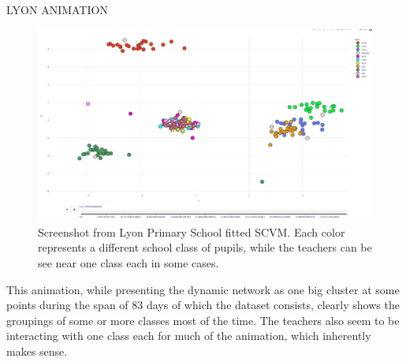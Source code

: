 LYON ANIMATION
\begin{figure}[H]
    \centering
    \includegraphics[width=\textwidth]{0_images/lyon_screenshot.png}
    \caption{Screenshot from Lyon Primary School fitted SCVM. Each color represents a different school class of pupils, while the teachers can be see near one class each in some cases.}
    \label{fig:LyonScreenshot}
\end{figure}


This animation, while presenting the dynamic network as one big cluster at some points during the span of 83 days of which the dataset consists, clearly shows the groupings of some or more classes most of the time.
The teachers also seem to be interacting with one class each for much of the animation, which inherently makes sense.